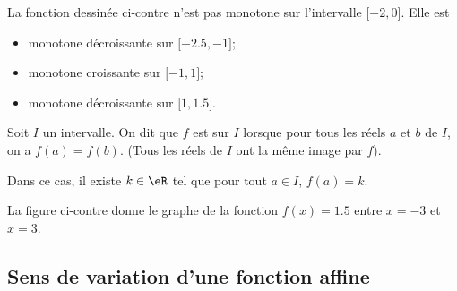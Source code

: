 \begin{multicols}{2}

    La fonction dessinée ci-contre n'est pas monotone sur l'intervalle \( \mathopen[ -2 , 0 \mathclose]\). Elle est
    \begin{itemize}
        \item 
            monotone décroissante sur \( \mathopen[ -2.5 , -1 \mathclose]\);
        \item
            monotone croissante sur \( \mathopen[ -1 , 1 \mathclose]\);
        \item
            monotone décroissante sur \( \mathopen[ 1 , 1.5 \mathclose]\).
    \end{itemize}

\columnbreak



\end{multicols}




\begin{definition}
    Soit \( I\) un intervalle. On dit que $f$ est  sur $I$ lorsque pour tous les réels $a$ et $b$ de $I$, on a $f(a)=f(b)$. (Tous les réels de $I$ ont la même image par $f$).
\end{definition}

\begin{multicols}{2}
    Dans ce cas, il existe $k\in\eR$ tel que pour tout $a\in I$, $f(a)=k$. 
    
    La figure ci-contre donne le graphe de la fonction \( f(x)=1.5\) entre \( x=-3\) et \( x=3\).

\columnbreak



\end{multicols}


\subsection{Sens de variation d'une fonction affine}

